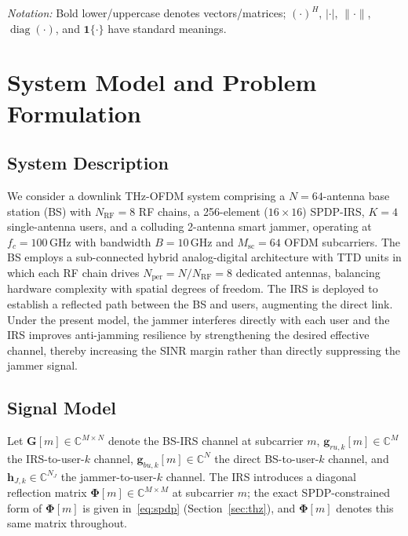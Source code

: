 \documentclass[journal,twocolumn]{IEEEtran}
\newcommand{\vect}[1]{\mathbf{#1}}
\newcommand{\mat}[1]{\mathbf{#1}}
\newcommand{\C}{\mathbb{C}}
\DeclareMathOperator{\diag}{diag}
\begin{document}
\emph{Notation:} Bold lower/uppercase denotes vectors/matrices; $(\cdot)^H$, $|\cdot|$, $\|\cdot\|$, $\diag(\cdot)$, and $\mathbf{1}\{\cdot\}$ have standard meanings.

\section{System Model and Problem Formulation}
\label{sec:system}

\subsection{System Description}

We consider a downlink THz-OFDM system comprising a $N=64$-antenna base station (BS) with $N_{\text{RF}}=8$ RF chains, a 256-element ($16\!\times\!16$) SPDP-IRS, $K=4$ single-antenna users, and a colluding 2-antenna smart jammer, operating at $f_c=100\,\text{GHz}$ with bandwidth $B=10\,\text{GHz}$ and $M_{\text{sc}}=64$ OFDM subcarriers. The BS employs a sub-connected hybrid analog-digital architecture with TTD units in which each RF chain drives $N_{\text{per}}=N/N_{\text{RF}}=8$ dedicated antennas, balancing hardware complexity with spatial degrees of freedom. The IRS is deployed to establish a reflected path between the BS and users, augmenting the direct link. Under the present model, the jammer interferes directly with each user and the IRS improves anti-jamming resilience by strengthening the desired effective channel, thereby increasing the SINR margin rather than directly suppressing the jammer signal.

\subsection{Signal Model}

Let $\mat{G}[m] \in \C^{M \times N}$ denote the BS-IRS channel at subcarrier $m$, $\vect{g}_{ru,k}[m] \in \C^{M}$ the IRS-to-user-$k$ channel, $\vect{g}_{bu,k}[m] \in \C^{N}$ the direct BS-to-user-$k$ channel, and $\vect{h}_{J,k} \in \C^{N_J}$ the jammer-to-user-$k$ channel. The IRS introduces a diagonal reflection matrix $\bm{\Phi}[m] \in \C^{M \times M}$ at subcarrier $m$; the exact SPDP-constrained form of $\bm{\Phi}[m]$ is given in~\eqref{eq:spdp} (Section~\ref{sec:thz}), and $\bm{\Phi}[m]$ denotes this same matrix throughout.
\end{document}
